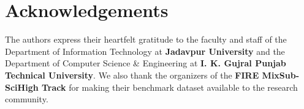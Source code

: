 \documentclass[11pt,a4paper]{article}
\begin{document}
\section*{Acknowledgements}
\small
The authors express their heartfelt gratitude to the faculty and staff of the Department of Information Technology at \textbf{Jadavpur University} and the Department of Computer Science \& Engineering at \textbf{I. K. Gujral Punjab Technical University}. We also thank the organizers of the \textbf{FIRE MixSub-SciHigh Track} for making their benchmark dataset available to the research community.



\end{document}
